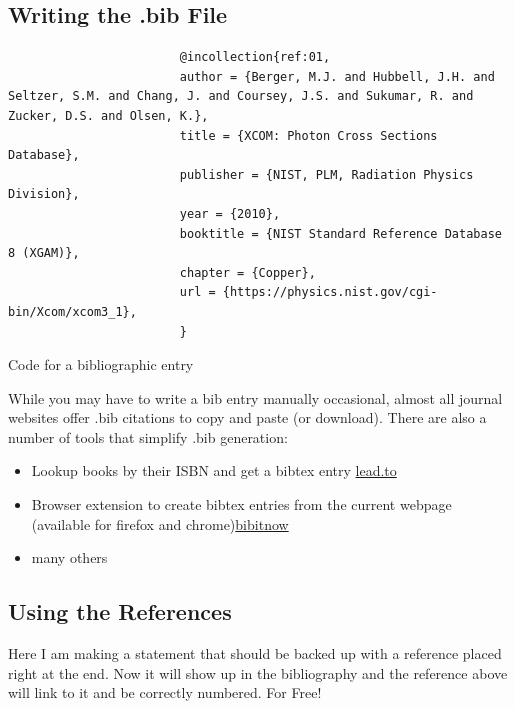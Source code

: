 \documentclass[hidelinks, 12pt]{article}%
\begin{document}
        \subsection{Writing the .bib File}
            \begin{listing}[H]
                \begin{centering}
                    \begin{verbatim}
                        @incollection{ref:01,
                        author = {Berger, M.J. and Hubbell, J.H. and Seltzer, S.M. and Chang, J. and Coursey, J.S. and Sukumar, R. and Zucker, D.S. and Olsen, K.},
                        title = {XCOM: Photon Cross Sections Database},
                        publisher = {NIST, PLM, Radiation Physics Division},
                        year = {2010},
                        booktitle = {NIST Standard Reference Database 8 (XGAM)},
                        chapter = {Copper},
                        url = {https://physics.nist.gov/cgi-bin/Xcom/xcom3_1},
                        }
                    \end{verbatim}
                    \caption{Code for a bibliographic entry}
                    \label{lst:bibliography}
                \end{centering}
            \end{listing}
            While you may have to write a bib entry manually occasional, almost all journal websites offer .bib citations to copy and paste (or download).
            There are also a number of tools that simplify .bib generation:
            \begin{itemize}
                \item Lookup books by their ISBN and get a bibtex entry \href{https://lead.to/amazon/com/?key=+&si=all&op=bt&bn=&so=sa&ht=us}{lead.to}
                \item Browser extension to create bibtex entries from the current webpage (available for firefox and chrome)\href{https://github.com/Langenscheiss/bibitnow}{bibitnow}
                \item many others
            \end{itemize}
        \subsection{Using the References}
            Here I am making a statement that should be backed up with a reference placed right at the end. \cite{ref:01}
            Now it will show up in the bibliography and the reference above will link to it and be
            correctly numbered. For Free!

    \clearpage
    \printbibliography[heading=bibintoc]
\end{document}
